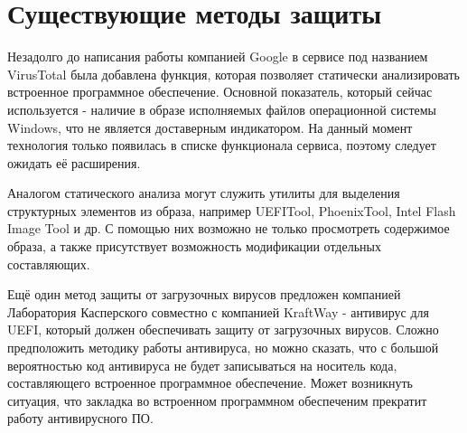 \section{Существующие методы защиты}

Незадолго до написания работы компанией Google в сервисе под названием VirusTotal была добавлена функция,
	которая позволяет статически анализировать встроенное программное обеспечение.
Основной показатель, который сейчас используется -
	наличие в образе исполняемых файлов операционной системы Windows,
	что не является доставерным индикатором.
На данный момент технология только появилась в списке функционала сервиса,
	поэтому следует ожидать её расширения.

Аналогом статического анализа могут служить утилиты для выделения структурных элементов из образа, например UEFITool, PhoenixTool, Intel Flash Image Tool и др.
С помощью них возможно не только просмотреть содержимое образа,
	а также присутствует возможность модификации отдельных составляющих.

Ещё один метод защиты от загрузочных вирусов предложен компанией Лаборатория Касперского совместно с компанией KraftWay - антивирус для UEFI,
	который должен обеспечивать защиту от загрузочных вирусов.\cite{proj:KaspAntiv}
Сложно предположить методику работы антивируса,
	но можно сказать, что с большой вероятностью код антивируса не будет записываться на носитель кода, составляющего встроенное программное обеспечение.
Может возникнуть ситуация,
	что закладка во встроенном программном обеспеченим прекратит работу антивирусного ПО.

